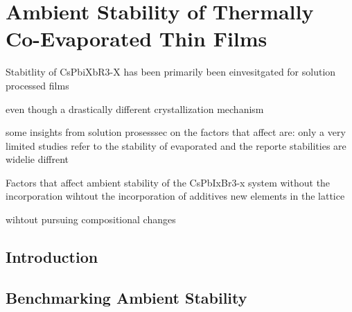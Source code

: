\chapter{Ambient Stability of Thermally Co-Evaporated  Thin Films}\label{ch:stability}

Stabitlity of CsPbiXbR3-X has been primarily been einvesitgated for solution processed films

even though a drastically different crystallization mechanism 

some insights from solution prosesssec on the factors that affect are: 
 only a very limited studies refer to the stability of evaporated and the reporte stabilities are widelie diffrent 


Factors that affect ambient stability of the CsPbIxBr3-x system without the incorporation wihtout the incorporation of additives new elements in the lattice 

wihtout pursuing compositional changes


\section{Introduction}

\section{Benchmarking Ambient Stability}


